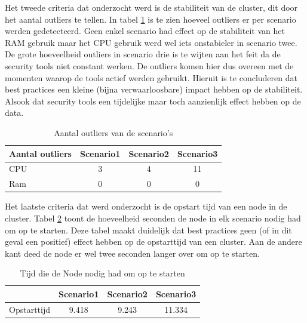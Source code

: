 Het tweede criteria dat onderzocht werd is de stabiliteit van de cluster, dit door het aantal outliers te tellen. In tabel \ref{tab:Outliers} is te zien hoeveel outliers er per scenario werden gedetecteerd. Geen enkel scenario had effect op de stabiliteit van het RAM gebruik maar het CPU gebruik werd wel iets onstabieler in scenario twee. De grote hoeveelheid outliers in scenario drie is te wijten aan het feit da de security tools niet constant werken. De outliers komen hier dus overeen met de momenten waarop de tools actief werden gebruikt. Hieruit is te concluderen dat best practices een kleine (bijna verwaarloosbare) impact hebben op de stabiliteit. Alsook dat security tools een tijdelijke maar toch aanzienlijk effect hebben op de data.
%
\begin{table}[h]
	\centering
	\begin{tabular}{lccc}
		Aantal outliers & Scenario1 & Scenario2 & Scenario3 \\ \hline
		CPU             & 3         & 4         & 11        \\ \hline
		Ram             & 0         & 0         & 0        
	\end{tabular}
	\caption{Aantal outliers van de scenario's}
	\label{tab:Outliers}
\end{table}

Het laatste criteria dat werd onderzocht is de opstart tijd van een node in de cluster. Tabel \ref{tab:BootTime} toont de hoeveelheid seconden de node in elk scenario nodig had om op te starten. Deze tabel maakt duidelijk dat best practices geen (of in dit geval een positief) effect hebben op de opstarttijd van een cluster. Aan de andere kant deed de node er wel twee seconden langer over om op te starten. 

\begin{table}[h]
	\centering
	\begin{tabular}{lccc}
		& Scenario1 & Scenario2 & Scenario3 \\ \hline
		Opstarttijd & 9.418     & 9.243     & 11.334   
	\end{tabular}
	\caption{Tijd die de Node nodig had om op te starten}
	\label{tab:BootTime}
\end{table}


